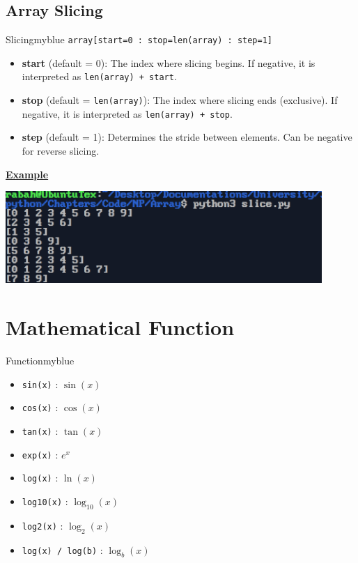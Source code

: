 \subsection{Array Slicing}
\begin{prettyBox}{Slicing}{myblue}
\texttt{array[start=0 : stop=len(array) : step=1]}
\begin{itemize}
    \item \textbf{start} (default = 0): The index where slicing begins. If negative, it is interpreted as \texttt{len(array) + start}.
    \item \textbf{stop} (default = \texttt{len(array)}): The index where slicing ends (exclusive). If negative, it is interpreted as \texttt{len(array) + stop}.
    \item \textbf{step} (default = 1): Determines the stride between elements. Can be negative for reverse slicing.
\end{itemize}
\end{prettyBox}

\vspace{0.5cm}

\textbf{\underline{Example}}\\[0.1cm]


\vspace{0.25cm}
\begin{center}
    \includegraphics[width = 0.9\textwidth]{Chapters/ScreenShot/NP/Array/sliceOutput.png}
\end{center}

\newpage
\section{Mathematical Function}
\begin{prettyBox}{Function}{myblue}
\begin{itemize}
    \item \texttt{sin(x)} : \(\sin{(x)}\)  
    \item \texttt{cos(x)} : \(\cos{(x)}\)
    \item \texttt{tan(x)} : \(\tan{(x)}\)
    \item \texttt{exp(x)} : \(e^{x}\)
    \item \texttt{log(x)} : \(\ln{(x)}\) 
    \item \texttt{log10(x)} : \(\log_{10}{(x)}\)
    \item \texttt{log2(x)} : \(\log_{2}{(x)}\)
    \item \texttt{log(x) / log(b)} : \(\log_b{(x)}\)
\end{itemize}
\end{prettyBox}
